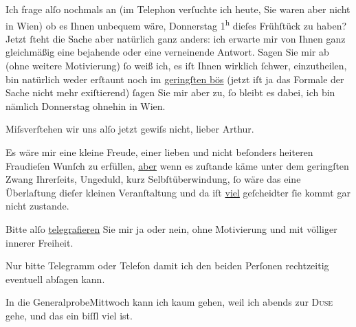 \pstart
           Ich frage alſo nochmals an (im Telephon verſuchte ich heute, Sie waren aber nicht in
                  Wien) ob es Ihnen unbequem wäre,
                  Donnerstag{ }1\textsuperscript{h} dieſes Frühſtück zu haben? Jetzt ſteht die Sache aber
                  {\pb}natürlich ganz anders: ich
               erwarte mir von Ihnen ganz gleichmäßig eine bejahende oder eine verneinende Antwort.
               Sagen Sie mir ab (ohne weitere Motivierung) ſo weiß ich, es iſt Ihnen wirklich
               ſchwer, einzutheilen, bin natürlich weder erſtaunt noch im \uline{geringſten bös} (jetzt iſt ja das Formale der Sache nicht mehr exiſtierend)
                  {\pb}ſagen Sie mir aber zu, ſo
               bleibt es dabei, ich bin nämlich Donnerstag ohnehin in Wien.\pend
           
\pstart
           Miſsverſtehen wir uns alſo jetzt gewiſs nicht, lieber Arthur.\pend
           
\pstart
           Es wäre mir eine kleine Freude, einer lieben und nicht beſonders heiteren Fraudieſen Wunſch zu erfüllen, \uline{aber} wenn es zuſtande käme unter dem geringſten Zwang
               Ihrerſeits, Ungeduld, kurz Selbſtüberwindung, ſo wäre das eine Überlaſtung dieſer
               kleinen Veranſtaltung und da iſt \uline{viel} geſcheidter {\pb}ſie kommt gar nicht zustande.\pend
           
\pstart
           Bitte alſo \uline{telegrafieren} Sie mir ja oder nein, ohne
               Motivierung und mit völliger innerer Freiheit.\pend
           
\pstart
           Nur bitte Telegramm oder Telefon damit ich den beiden Perſonen rechtzeitig eventuell {\pb}abſagen kann.\pend
           
\pstart
           In die GeneralprobeMittwoch kann ich kaum gehen, weil ich abends zur \textsc{Duse} gehe, und das ein biſſl viel ist.\pend
           

